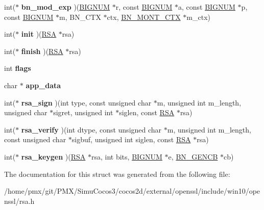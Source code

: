 \begin{DoxyCompactItemize}
\item 
\mbox{\label{structrsa__meth__st_a1dc3f40f6072ffed989d7dfedc66cda1}} 
int($\ast$ {\bfseries bn\+\_\+mod\+\_\+exp} )(\hyperlink{structbignum__st}{B\+I\+G\+N\+UM} $\ast$r, const \hyperlink{structbignum__st}{B\+I\+G\+N\+UM} $\ast$a, const \hyperlink{structbignum__st}{B\+I\+G\+N\+UM} $\ast$p, const \hyperlink{structbignum__st}{B\+I\+G\+N\+UM} $\ast$m, B\+N\+\_\+\+C\+TX $\ast$ctx, \hyperlink{structbn__mont__ctx__st}{B\+N\+\_\+\+M\+O\+N\+T\+\_\+\+C\+TX} $\ast$m\+\_\+ctx)
\item 
\mbox{\label{structrsa__meth__st_ac8c394e65dbeda15573657fb550c5fe7}} 
int($\ast$ {\bfseries init} )(\hyperlink{structrsa__st}{R\+SA} $\ast$rsa)
\item 
\mbox{\label{structrsa__meth__st_a12aded957112894c6fd832168a380fbc}} 
int($\ast$ {\bfseries finish} )(\hyperlink{structrsa__st}{R\+SA} $\ast$rsa)
\item 
\mbox{\label{structrsa__meth__st_ab01ea2742087308a50209ccff23832c7}} 
int {\bfseries flags}
\item 
\mbox{\label{structrsa__meth__st_a3d4a936065797413aad5dc1c7a132f00}} 
char $\ast$ {\bfseries app\+\_\+data}
\item 
\mbox{\label{structrsa__meth__st_a9417375cd40a1ebef8631897593212e5}} 
int($\ast$ {\bfseries rsa\+\_\+sign} )(int type, const unsigned char $\ast$m, unsigned int m\+\_\+length, unsigned char $\ast$sigret, unsigned int $\ast$siglen, const \hyperlink{structrsa__st}{R\+SA} $\ast$rsa)
\item 
\mbox{\label{structrsa__meth__st_a9a5b98e6b902fd0a31b0663b91460627}} 
int($\ast$ {\bfseries rsa\+\_\+verify} )(int dtype, const unsigned char $\ast$m, unsigned int m\+\_\+length, const unsigned char $\ast$sigbuf, unsigned int siglen, const \hyperlink{structrsa__st}{R\+SA} $\ast$rsa)
\item 
\mbox{\label{structrsa__meth__st_a08d964380b9ca4fd0d7664fe0d14dfd0}} 
int($\ast$ {\bfseries rsa\+\_\+keygen} )(\hyperlink{structrsa__st}{R\+SA} $\ast$rsa, int bits, \hyperlink{structbignum__st}{B\+I\+G\+N\+UM} $\ast$e, \hyperlink{structbn__gencb__st}{B\+N\+\_\+\+G\+E\+N\+CB} $\ast$cb)
\end{DoxyCompactItemize}


The documentation for this struct was generated from the following file\+:\begin{DoxyCompactItemize}
\item 
/home/pmx/git/\+P\+M\+X/\+Simu\+Cocos3/cocos2d/external/openssl/include/win10/openssl/rsa.\+h\end{DoxyCompactItemize}
